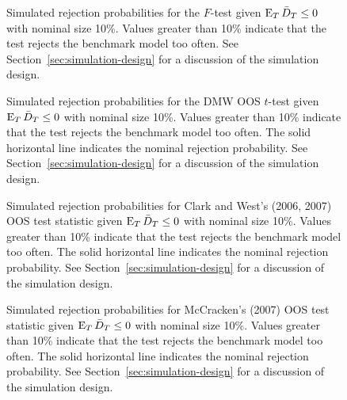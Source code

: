 \documentclass[12pt]{article}
\begin{document}
\begin{figure}
  \caption{Simulated rejection probabilities for the $F$-test given
    $\operatorname{E}_T \bar{D}_{T} \leq 0$ with nominal size 10\%.  Values greater than
    10\% indicate that the test rejects the benchmark model too often.
    See Section~\ref{sec:simulation-design} for a discussion of the
    simulation design.}
  \label{fig:ftest}
\end{figure}
\clearpage
\begin{figure}
   
  \caption{Simulated rejection probabilities for the DMW
    OOS $t$-test given $\operatorname{E}_T \bar{D}_{T} \leq 0$ with nominal
    size 10\%.  Values greater than 10\% indicate that the test
    rejects the benchmark model too often.  The solid horizontal line
    indicates the nominal rejection probability.  See
    Section~\ref{sec:simulation-design} for a discussion of the
    simulation design.}
  \label{fig:ttest-size}
\end{figure}

\begin{figure}
  \caption{Simulated rejection probabilities for Clark and West's
    (2006, 2007) OOS test statistic given $\operatorname{E}_T \bar{D}_{T}
    \leq 0$ with nominal size 10\%.  Values greater than 10\% indicate
    that the test rejects the benchmark model too often.  The solid
    horizontal line indicates the nominal rejection probability.  See
    Section~\ref{sec:simulation-design} for a discussion of the
    simulation design.}
   \label{fig:clarkwest}
\end{figure}

\begin{figure}
  \caption{Simulated rejection probabilities for McCracken's (2007)
    OOS test statistic given $\operatorname{E}_T \bar{D}_{T} \leq 0$ with
    nominal size 10\%.  Values greater than 10\% indicate that the
    test rejects the benchmark model too often.  The solid horizontal
    line indicates the nominal rejection probability.  See
    Section~\ref{sec:simulation-design} for a discussion of the
    simulation design.}
  \label{fig:mccracken}
\end{figure}
\end{document}
